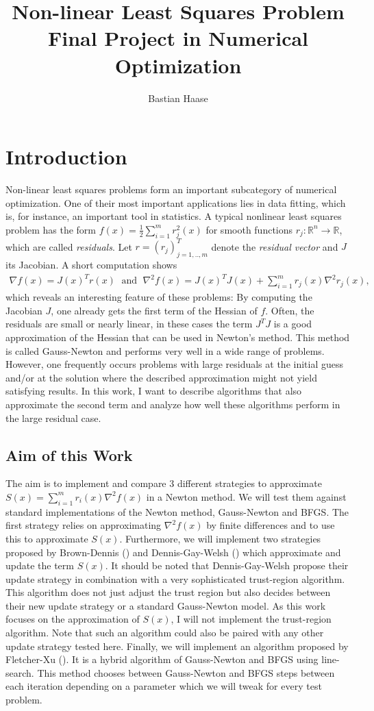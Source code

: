 \documentclass{article}
\title{Non-linear Least Squares Problem \\{\Large Final Project in  Numerical Optimization}}
\date{}
\author{Bastian Haase}
\theoremstyle{plain}%
\theoremstyle{definition}
\begin{document}
\maketitle
\tableofcontents
\newpage 
\section{Introduction}
Non-linear least squares problems form an important subcategory of numerical
optimization. One of their most important applications lies in data fitting, which is, for instance, an important tool in statistics. A typical nonlinear least squares problem has the form 
$
  f(x)=\frac{1}{2}\sum_{i=1}^{m} r_j^2(x)
$
for smooth functions $r_j: \mathbb{R}^n\rightarrow \mathbb{R}$, which are called  \emph{residuals}. Let $r=(r_j)_{j=1,..,m}^T$ denote the \emph{residual vector} and $J$ its Jacobian. A short
computation shows 
\begin{align*}
  \nabla f(x)= J(x)^Tr(x)\; \textrm{ and } \; \nabla^2 f(x)= J(x)^TJ(x)+ \sum_{i=1}^m r_j(x)\nabla^2 r_j(x),
\end{align*}
which reveals an interesting feature of these problems: By computing the Jacobian $J$, one already
gets the first term of the Hessian of $f$. Often, the residuals are small or nearly linear, in these cases the term $J^TJ$ is a good approximation of the Hessian that can be used in Newton's method. This method is called Gauss-Newton and performs very well in a wide range of problems. However, one frequently occurs problems with large residuals at the initial guess and/or at the solution where  the described approximation
might not yield satisfying results. In this work, I want to describe algorithms that also approximate the
second term and analyze how well these algorithms perform in the large residual case. 
\subsection{Aim of this Work}
The aim is to implement and compare 3 different strategies to approximate $S(x)=\sum_{i=1}^{m}r_i(x) \nabla^2f(x)$ in a Newton method. We will test them against standard implementations
of the Newton method, Gauss-Newton and BFGS. The first strategy relies on approximating $\nabla^2 f(x)$ by finite differences and to use this to approximate $S(x)$. Furthermore, we will implement two strategies proposed by Brown-Dennis (\cite{Brown1971}) and
Dennis-Gay-Welsh (\cite{Dennis1981}) which approximate and update the term $S(x)$. It should be noted
that Dennis-Gay-Welsh propose their update strategy in combination with a very sophisticated 
trust-region algorithm. This algorithm does not just adjust the trust region but also
decides between their new update strategy or a standard Gauss-Newton model. As this work
focuses on the approximation of $S(x)$, I will not implement the trust-region algorithm. 
Note that such an algorithm could also be paired with any other update strategy tested here. Finally,
we will implement an algorithm proposed by Fletcher-Xu (\cite{Fletcher1987}). It is a hybrid
algorithm of Gauss-Newton and BFGS using line-search. This method chooses between Gauss-Newton and BFGS steps between
each iteration depending on a parameter which we will tweak for every test problem.
\end{document}
